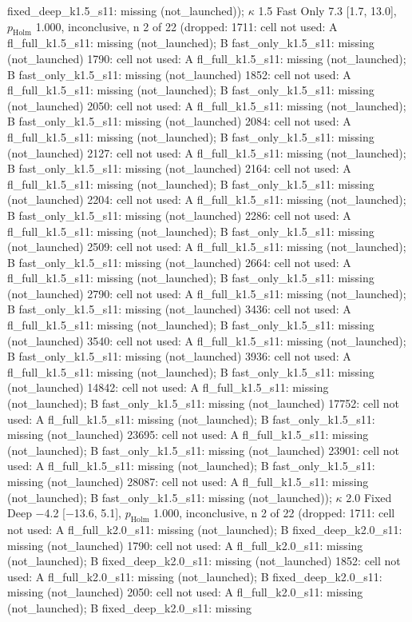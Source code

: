 fixed\_deep\_k1.5\_s11: missing (not\_launched)); $\kappa$ 1.5 Fast Only 7.3 [1.7, 13.0], $p_\mathrm{Holm}$ 1.000, inconclusive, n 2 of 22 (dropped: 1711: cell not used: A fl\_full\_k1.5\_s11: missing (not\_launched); B fast\_only\_k1.5\_s11: missing (not\_launched) \textbar{} 1790: cell not used: A fl\_full\_k1.5\_s11: missing (not\_launched); B fast\_only\_k1.5\_s11: missing (not\_launched) \textbar{} 1852: cell not used: A fl\_full\_k1.5\_s11: missing (not\_launched); B fast\_only\_k1.5\_s11: missing (not\_launched) \textbar{} 2050: cell not used: A fl\_full\_k1.5\_s11: missing (not\_launched); B fast\_only\_k1.5\_s11: missing (not\_launched) \textbar{} 2084: cell not used: A fl\_full\_k1.5\_s11: missing (not\_launched); B fast\_only\_k1.5\_s11: missing (not\_launched) \textbar{} 2127: cell not used: A fl\_full\_k1.5\_s11: missing (not\_launched); B fast\_only\_k1.5\_s11: missing (not\_launched) \textbar{} 2164: cell not used: A fl\_full\_k1.5\_s11: missing (not\_launched); B fast\_only\_k1.5\_s11: missing (not\_launched) \textbar{} 2204: cell not used: A fl\_full\_k1.5\_s11: missing (not\_launched); B fast\_only\_k1.5\_s11: missing (not\_launched) \textbar{} 2286: cell not used: A fl\_full\_k1.5\_s11: missing (not\_launched); B fast\_only\_k1.5\_s11: missing (not\_launched) \textbar{} 2509: cell not used: A fl\_full\_k1.5\_s11: missing (not\_launched); B fast\_only\_k1.5\_s11: missing (not\_launched) \textbar{} 2664: cell not used: A fl\_full\_k1.5\_s11: missing (not\_launched); B fast\_only\_k1.5\_s11: missing (not\_launched) \textbar{} 2790: cell not used: A fl\_full\_k1.5\_s11: missing (not\_launched); B fast\_only\_k1.5\_s11: missing (not\_launched) \textbar{} 3436: cell not used: A fl\_full\_k1.5\_s11: missing (not\_launched); B fast\_only\_k1.5\_s11: missing (not\_launched) \textbar{} 3540: cell not used: A fl\_full\_k1.5\_s11: missing (not\_launched); B fast\_only\_k1.5\_s11: missing (not\_launched) \textbar{} 3936: cell not used: A fl\_full\_k1.5\_s11: missing (not\_launched); B fast\_only\_k1.5\_s11: missing (not\_launched) \textbar{} 14842: cell not used: A fl\_full\_k1.5\_s11: missing (not\_launched); B fast\_only\_k1.5\_s11: missing (not\_launched) \textbar{} 17752: cell not used: A fl\_full\_k1.5\_s11: missing (not\_launched); B fast\_only\_k1.5\_s11: missing (not\_launched) \textbar{} 23695: cell not used: A fl\_full\_k1.5\_s11: missing (not\_launched); B fast\_only\_k1.5\_s11: missing (not\_launched) \textbar{} 23901: cell not used: A fl\_full\_k1.5\_s11: missing (not\_launched); B fast\_only\_k1.5\_s11: missing (not\_launched) \textbar{} 28087: cell not used: A fl\_full\_k1.5\_s11: missing (not\_launched); B fast\_only\_k1.5\_s11: missing (not\_launched)); $\kappa$ 2.0 Fixed Deep $-$4.2 [$-$13.6, 5.1], $p_\mathrm{Holm}$ 1.000, inconclusive, n 2 of 22 (dropped: 1711: cell not used: A fl\_full\_k2.0\_s11: missing (not\_launched); B fixed\_deep\_k2.0\_s11: missing (not\_launched) \textbar{} 1790: cell not used: A fl\_full\_k2.0\_s11: missing (not\_launched); B fixed\_deep\_k2.0\_s11: missing (not\_launched) \textbar{} 1852: cell not used: A fl\_full\_k2.0\_s11: missing (not\_launched); B fixed\_deep\_k2.0\_s11: missing (not\_launched) \textbar{} 2050: cell not used: A fl\_full\_k2.0\_s11: missing (not\_launched); B fixed\_deep\_k2.0\_s11: missing 